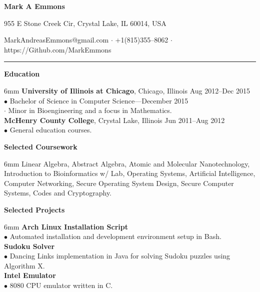 \documentclass[11pt]{article}
\newcommand{\sectionheader}[1]{\noindent \textbf{\large #1}}
\newenvironment{sectionbody}{\begin{adjustwidth}{6mm}{}}{\end{adjustwidth}}
\begin{document}

\centerline{\LARGE \bf Mark A Emmons}
\centerline{955 E Stone Creek Cir, Crystal Lake, IL 60014, USA}
\centerline{MarkAndreasEmmons@gmail.com $\cdot$ +1(815)355--8062 $\cdot$ https://Github.com/MarkEmmons}

\noindent\rule{16.5cm}{0.4pt}

\sectionheader{Education}
\begin{sectionbody}
{\bf University of Illinois at Chicago}, Chicago, Illinois \hfill Aug 2012--Dec 2015 \\
$\bullet$ Bachelor of Science in Computer Science---December 2015 \\
\indent $\cdot$ Minor in Bioengineering and a focus in Mathematics. \\
{\bf McHenry County College}, Crystal Lake, Illinois \hfill Jun 2011--Aug 2012 \\
$\bullet$ General education courses.
\end{sectionbody}

\vspace{2mm}

\sectionheader{Selected Coursework}
\begin{sectionbody}
Linear Algebra, Abstract Algebra, Atomic and Molecular Nanotechnology, Introduction to Bioinformatics w/ Lab, Operating Systems, Artificial Intelligence, Computer Networking, Secure Operating System Design, Secure Computer Systems, Codes and Cryptography.
\end{sectionbody}

\vspace{2mm}

\sectionheader{Selected Projects}
\begin{sectionbody}
{\bf Arch Linux Installation Script} \\
$\bullet$ Automated installation and development environment setup in Bash. \\
{\bf Sudoku Solver} \\
$\bullet$ Dancing Links implementation in Java for solving Sudoku puzzles using Algorithm X. \\
{\bf Intel Emulator} \\
$\bullet$ 8080 CPU emulator written in C.
\end{sectionbody}
\end{document}
